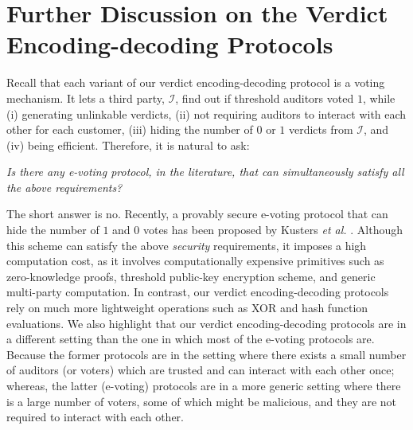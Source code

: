 
\section{Further Discussion on the Verdict Encoding-decoding Protocols}\label{sec:: Further-Discussion-on-the-Encoding-decoding-Protocol}




Recall that  each variant of our verdict encoding-decoding protocol is a voting mechanism. It  lets a third party, $\mathcal{I}$, find out if threshold auditors voted $1$, while (i) generating unlinkable verdicts, (ii) not requiring auditors to interact with each other for each customer, (iii) hiding the number of $0$ or $1$ verdicts from  $\mathcal{I}$, and (iv) being  efficient. Therefore, it is natural to ask: 

\begin{center}
\emph{Is there   any {e-voting} protocol, in the literature, that can  simultaneously satisfy all the above requirements?}
\end{center}


The short answer is no. Recently, a provably secure  e-voting protocol that can hide the number of $1$ and $0$ votes has been proposed by K{u}sters \textit{et al.} \cite{KustersL00020}. Although this scheme can satisfy the above \emph{security} requirements, it imposes a high computation cost, as  it involves computationally expensive primitives such as zero-knowledge proofs, threshold public-key encryption scheme, and generic multi-party computation. In contrast, our verdict encoding-decoding protocols rely on much more lightweight operations such as XOR and hash function evaluations.  We also  highlight that our verdict encoding-decoding protocols are in a different setting than the one in which most of the e-voting protocols are. Because the former protocols are in the setting where there exists a small number of auditors (or voters) which are trusted and can interact with each other once; whereas, the latter (e-voting) protocols are in a more   generic setting where there is a large number of  voters, some of which might be malicious, and they are not   required to interact with each other. 


